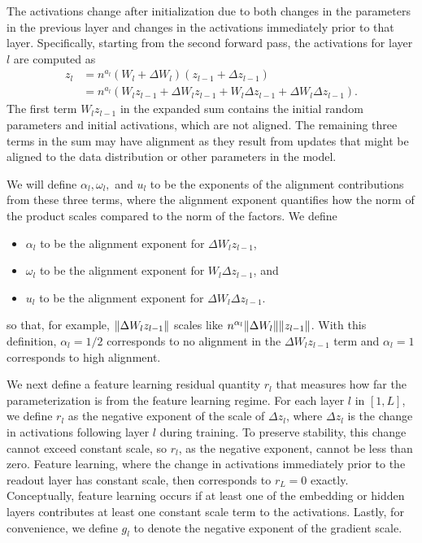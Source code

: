 \documentclass{article}
\theoremstyle{plain}
\theoremstyle{definition}
\theoremstyle{remark}
\begin{document}
The activations change after initialization due to both changes in the parameters in the previous layer and changes in the activations immediately prior to that layer. Specifically, starting from the second forward pass, the activations for layer $l$ are computed as
\begin{align*}
    z_l &= n^{a_l} (W_l + \Delta W_l)(z_{l-1} + \Delta z_{l-1})\\
    &= n^{a_l} (W_lz_{l-1} + \Delta W_lz_{l-1} + W_l\Delta z_{l-1} + \Delta W_l\Delta z_{l-1}).
\end{align*}
The first term $W_l z_{l-1}$ in the expanded sum contains the initial random parameters and initial activations, which are not aligned. The remaining three terms in the sum may have alignment as they result from updates that might be aligned to the data distribution or other parameters in the model.

We will define $\alpha_l, \omega_l,$ and $u_l$ to be the exponents of the alignment contributions from these three terms, where the alignment exponent quantifies how the norm of the product scales compared to the norm of the factors. We define
\begin{itemize}
    \item $\alpha_l$ to be the alignment exponent for $\Delta W_l z_{l-1}$,
    \item $\omega_l$ to be the alignment exponent for $W_l \Delta z_{l-1}$, and
    \item $u_l$ to be the alignment exponent for $\Delta W_l \Delta z_{l-1}$.
\end{itemize}
so that, for example, $\norm{\Delta W_l z_{l-1}}$ scales like $n^{\alpha_l} \norm{\Delta W_l} \norm{z_{l-1}}$. With this definition, $\alpha_l = 1/2$ corresponds to no alignment in the $\Delta W_l z_{l-1}$ term and $\alpha_l=1$ corresponds to high alignment.

We next define a feature learning residual quantity $r_l$ that measures how far the parameterization is from the feature learning regime. For each layer $l$ in $[1, L]$, we define $r_l$ as the negative exponent of the scale of $\Delta z_l$, where $\Delta z_l$ is the change in activations following layer $l$ during training. To preserve stability, this change cannot exceed constant scale, so $r_l$, as the negative exponent, cannot be less than zero. Feature learning, where the change in activations immediately prior to the readout layer has constant scale, then corresponds to $r_L = 0$ exactly. Conceptually, feature learning occurs if at least one of the embedding or hidden layers contributes at least one constant scale term to the activations. Lastly, for convenience, we define $g_l$ to denote the negative exponent of the gradient scale.
\end{document}
